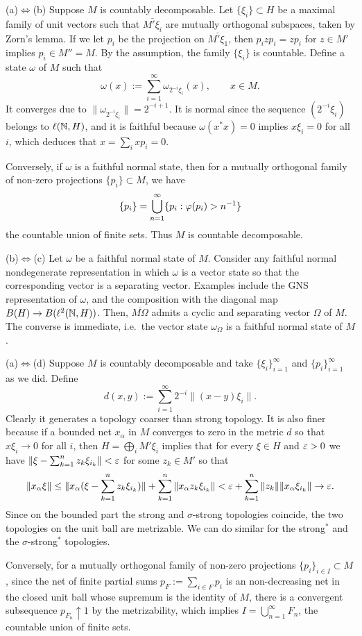\documentclass{../../small}
\begin{document}
\begin{pf}
(a)$\Leftrightarrow$(b)
Suppose $M$ is countably decomposable.
Let $\{\xi_i\}\subset H$ be a maximal family of unit vectors such that $\bar{M'\xi_i}$ are mutually orthogonal subspaces, taken by Zorn's lemma.
If we let $p_i$ be the projection on $\bar{M'\xi_1}$, then $p_izp_i=zp_i$ for $z\in M'$ implies $p_i\in M''=M$.
By the assumption, the family $\{\xi_i\}$ is countable.
Define a state $\omega$ of $M$ such that
\[\omega(x):=\sum_{i=1}^\infty\omega_{2^{-i}\xi_i}(x),\qquad x\in M.\]
It converges due to $\|\omega_{2^{-i}\xi_i}\|=2^{-i+1}$.
It is normal since the sequence $(2^{-i}\xi_i)$ belongs to $\ell(\mathbb{N},H)$, and it is faithful because $\omega(x^*x)=0$ implies $x\xi_i=0$ for all $i$, which deduces that $x=\sum_ixp_i=0$.

Conversely, if $\omega$ is a faithful normal state, then for a mutually orthogonal family of non-zero projections $\{p_i\}\subset M$, we have
\[\{p_i\}=\bigcup_{n=1}^\infty\{p_i:\varphi(p_i)>n^{-1}\}\]
the countable union of finite sets.
Thus $M$ is countable decomposable.

(b)$\Leftrightarrow$(c)
Let $\omega$ be a faithful normal state of $M$.
Consider any faithful normal nondegenerate representation in which $\omega$ is a vector state so that the corresponding vector is a separating vector.
Examples include the GNS representation of $\omega$, and the composition with the diagonal map $B(H)\to B(\ell^2(\mathbb{N},H))$.
Then, $\bar{M\Omega}$ admits a cyclic and separating vector $\Omega$ of $M$.
The converse is immediate, i.e.~the vector state $\omega_\Omega$ is a faithful normal state of $M$.

(a)$\Leftrightarrow$(d)
Suppose $M$ is countably decomposable and take $\{\xi_i\}_{i=1}^\infty$ and $\{p_i\}_{i=1}^\infty$ as we did.
Define
\[d(x,y):=\sum_{i=1}^\infty2^{-i}\|(x-y)\xi_i\|.\]
Clearly it generates a topology coarser than strong topology.
It is also finer because if a bounded net $x_\alpha$ in $M$ converges to zero in the metric $d$ so that $x\xi_i\to0$ for all $i$, then $H=\bigoplus_iM'\xi_i$ implies that for every $\xi\in H$ and $\varepsilon>0$ we have $\|\xi-\sum_{k=1}^nz_k\xi_{i_k}\|<\varepsilon$ for some $z_k\in M'$ so that
\[\|x_\alpha\xi\|\le\|x_\alpha(\xi-\sum_{k=1}^nz_k\xi_{i_k})\|+\sum_{k=1}^n\|x_\alpha z_k\xi_{i_k}\|<\varepsilon+\sum_{k=1}^n\|z_k\|\|x_\alpha\xi_{i_k}\|\to\varepsilon.\]
Since on the bounded part the strong and $\sigma$-strong topologies coincide, the two topologies on the unit ball are metrizable.
We can do similar for the strong$^*$ and the $\sigma$-strong$^*$ topologies.

Conversely, for a mutually orthogonal family of non-zero projections $\{p_i\}_{i\in I}\subset M$, since the net of finite partial sums $p_F:=\sum_{i\in F}p_i$ is an non-decreasing net in the closed unit ball whose supremum is the identity of $M$, there is a convergent subsequence $p_{F_n}\uparrow1$ by the metrizability, which implies $I=\bigcup_{n=1}^\infty F_n$, the countable union of finite sets.
\end{pf}
\end{document}
